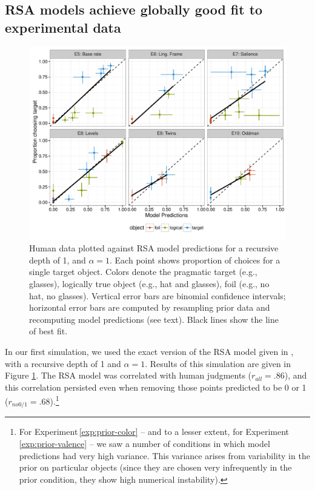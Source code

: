\documentclass[man,noapacite]{apa2}
\newcounter{Experiment}
\newcommand{\exptref}[1]{Experiment\,\ref{#1}}
\begin{document}
\subsection{RSA models achieve globally good fit to experimental data}

\begin{figure}[t]
 \centering
 \includegraphics[width=6in]{../plots/model_basic.pdf}
 \caption{\label{fig:basic} Human data plotted against RSA model predictions for a recursive depth of 1, and $\alpha=1$. Each point shows proportion of choices for a single target object. Colors denote the pragmatic target (e.g., glasses), logically true object (e.g., hat and glasses), foil (e.g., no hat, no glasses). Vertical error bars are binomial confidence intervals; horizontal error bars are computed by resampling prior data and recomputing model predictions (see text). Black lines show the line of best fit.}
\end{figure}

In our first simulation, we used the exact version of the RSA model given in , with a recursive depth of 1 and $\alpha=1$. Results of this simulation are given in Figure \ref{fig:basic}. The RSA model was correlated with human judgments ($r_{all} = .86$), and this correlation persisted even when removing those points predicted to be 0 or 1 ($r_{no 0/1} = .68$).\footnote{For \exptref{exp:prior-color} -- and to a lesser extent, for \exptref{exp:prior-valence} -- we saw a number of conditions in which model predictions had very high variance. This variance arises from variability in the prior on particular objects (since they are chosen very infrequently in the prior condition, they show high numerical instability).}
\end{document}
